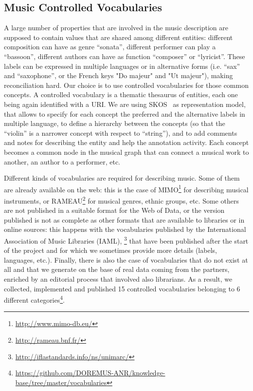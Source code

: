 \subsection{Music Controlled Vocabularies}
A large number of properties that are involved in the music description are supposed to contain values that are shared among different entities: different composition can have as genre ``sonata'', different performer can play a ``bassoon'', different authors can have as function ``composer'' or ``lyricist''. These labels can be expressed in multiple languages or in alternative forms (i.e. ``sax'' and ``saxophone'', or the French keys "Do majeur" and "Ut majeur"), making reconciliation hard. Our choice is to use controlled vocabularies for those common concepts. A controlled vocabulary is a thematic thesaurus of entities, each one being again identified with a URI. We are using SKOS~\cite{miles2007skos} as representation model, that allows to specify for each concept the preferred and the alternative labels in multiple language, to define a hierarchy between the concepts (so that the ``violin'' is a narrower concept with respect to ``string''), and to add comments and notes for describing the entity and help the annotation activity. Each concept becomes a common node in the musical graph that can connect a musical work to another, an author to a performer, etc.

Different kinds of vocabularies are required for describing music.
Some of them are already available on the web: this is the case of MIMO\footnote{\url{http://www.mimo-db.eu/}} for describing musical instruments, or RAMEAU\footnote{\url{http://rameau.bnf.fr/}} for musical genres, ethnic groups, etc. Some others are not published in a suitable format for the Web of Data, or the version published is not as complete as other formats that are available to libraries or in online sources: this happens with the vocabularies published by the International Association of Music Libraries (IAML), \footnote{\url{http://iflastandards.info/ns/unimarc/}} that have been published after the start of the project and for which we sometimes provide more details (labels, languages, etc.). Finally, there is also the case of vocabularies that do not exist at all and that we generate on the base of real data coming from the partners, enriched by an editorial process that involved also librarians. As a result, we collected, implemented and published 15 controlled vocabularies belonging to 6 different categories\footnote{\url{https://github.com/DOREMUS-ANR/knowledge-base/tree/master/vocabularies}}.

